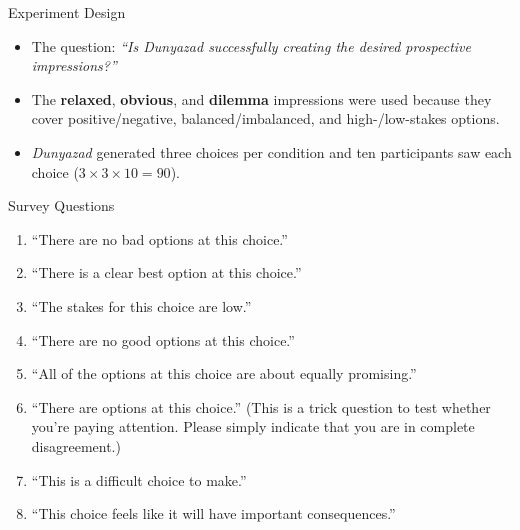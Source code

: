 \documentclass[xcolor=x11names]{beamer}
\def\dunyazad/{\textit{Dunyazad}}
\begin{document}
\begin{frame}{Experiment Design}
  \begin{itemize}\addtolength{\itemsep}{0.5\baselineskip}
    \item The question: \emph{``Is \dunyazad/ successfully creating the desired prospective impressions?''}
    \item The \textbf{relaxed}, \textbf{obvious}, and \textbf{dilemma} impressions were used because they cover positive/negative, balanced/imbalanced, and high-/low-stakes options.
    \item \dunyazad/ generated three choices per condition and ten participants saw each choice ($3 \times 3 \times 10 = 90$).
  \end{itemize}
\end{frame}

\begin{frame}{Survey Questions}
  \itshape
  \begin{enumerate}\addtolength{\itemsep}{0.5\baselineskip}
    \item ``There are no bad options at this choice.''
    \item ``There is a clear best option at this choice.''
    \item ``The stakes for this choice are low.''
    \item ``There are no good options at this choice.''
    \item ``All of the options at this choice are about equally promising.''
    \item ``There are options at this choice.'' (This is a trick question to test whether you’re paying attention. Please simply indicate that you are in complete disagreement.)
    \item ``This is a difficult choice to make.''
    \item ``This choice feels like it will have important consequences.''
  \end{enumerate}
\end{frame}
\end{document}

